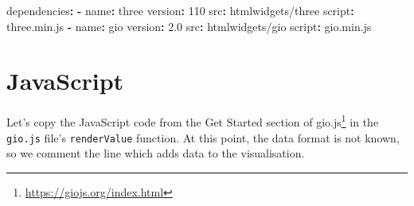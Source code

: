 \documentclass[
  10pt,
]{krantz}
\makeatletter
\newenvironment{Shaded}{\begin{snugshade}}{\end{snugshade}}
\newcommand{\AttributeTok}[1]{\textcolor[rgb]{0.61,0.61,0.61}{#1}}
\newcommand{\DecValTok}[1]{\textcolor[rgb]{0.06,0.06,0.06}{#1}}
\newcommand{\FloatTok}[1]{\textcolor[rgb]{0.06,0.06,0.06}{#1}}
\newcommand{\FunctionTok}[1]{\textcolor[rgb]{0,0,0}{#1}}
\newcommand{\KeywordTok}[1]{\textcolor[rgb]{0.27,0.27,0.27}{\textbf{#1}}}
\renewcommand{\href}[2]{#2\footnote{\url{#1}}}
\newenvironment{kframe}{%
\medskip{}
\setlength{\fboxsep}{.8em}
 \def\at@end@of@kframe{}%
 \ifinner\ifhmode%
  \def\at@end@of@kframe{\end{minipage}}%
  \begin{minipage}{\columnwidth}%
 \fi\fi%
 \def\FrameCommand##1{\hskip\@totalleftmargin \hskip-\fboxsep
 \colorbox{shadecolor}{##1}\hskip-\fboxsep
     \hskip-\linewidth \hskip-\@totalleftmargin \hskip\columnwidth}%
 \MakeFramed {\advance\hsize-\width
   \@totalleftmargin\z@ \linewidth\hsize
   \@setminipage}}%
 {\par\unskip\endMakeFramed%
 \at@end@of@kframe}
\renewenvironment{Shaded}{\begin{kframe}}{\end{kframe}}
\makeatother
\begin{document}
\begin{Shaded}
\begin{Highlighting}[]
\FunctionTok{dependencies}\KeywordTok{:}
\AttributeTok{  }\KeywordTok{{-}}\AttributeTok{ }\FunctionTok{name}\KeywordTok{:}\AttributeTok{ three}
\AttributeTok{    }\FunctionTok{version}\KeywordTok{:}\AttributeTok{ }\DecValTok{110}
\AttributeTok{    }\FunctionTok{src}\KeywordTok{:}\AttributeTok{ htmlwidgets/three}
\AttributeTok{    }\FunctionTok{script}\KeywordTok{:}\AttributeTok{ three.min.js}
\AttributeTok{  }\KeywordTok{{-}}\AttributeTok{ }\FunctionTok{name}\KeywordTok{:}\AttributeTok{ gio}
\AttributeTok{    }\FunctionTok{version}\KeywordTok{:}\AttributeTok{ }\FloatTok{2.0}
\AttributeTok{    }\FunctionTok{src}\KeywordTok{:}\AttributeTok{ htmlwidgets/gio}
\AttributeTok{    }\FunctionTok{script}\KeywordTok{:}\AttributeTok{ gio.min.js}
\end{Highlighting}
\end{Shaded}

\hypertarget{widgets-full-js}{%
\section{JavaScript}\label{widgets-full-js}}

Let's copy the JavaScript code from the \href{https://giojs.org/index.html}{Get Started section of gio.js} in the \texttt{gio.js} file's \texttt{renderValue} function. At this point, the data format is not known, so we comment the line which adds data to the visualisation.
\end{document}
